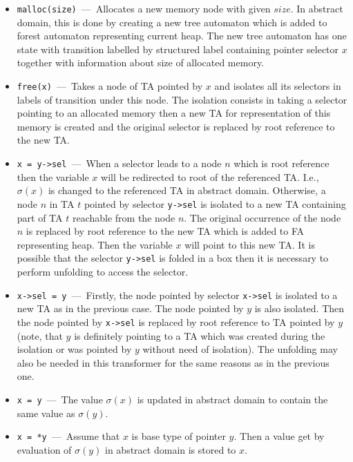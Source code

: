 \documentclass[a4paper, 12pt]{article}
\begin{document}
\begin{itemize}
	\item \texttt{malloc(size)} \,---\, Allocates a new memory node with given $size$.
		In abstract domain, this is done by creating a new tree automaton which
		is added to forest automaton representing current heap.
		The new tree automaton has one state with transition labelled by
		structured label containing pointer selector $x$ together with information
		about size of allocated memory.
	\item \texttt{free(x)} \,---\, Takes a node of TA pointed by $x$ and isolates all
		its selectors in labels of transition under this node.
		The isolation consists in taking a selector pointing to an allocated memory
		then a new TA for representation of this memory is created and
		the original selector is replaced by root reference to the new TA.
	\item \texttt{x = y->sel} \,---\, When a selector leads to a node $n$ which is root
		reference then the variable $x$ will be redirected to root of the referenced TA.
		I.e., $\sigma(x)$ is changed to the referenced TA in abstract domain.
		Otherwise, a node $n$ in TA $t$ pointed by selector \texttt{y->sel} is isolated to a new TA
		containing part of TA $t$ reachable from the node $n$.
		The original occurrence of the node $n$ is replaced by root reference
		to the new TA which is added to FA representing heap.
		Then the variable $x$ will point to this new TA.
		It is possible that the selector \texttt{y->sel} is folded
		in a box then it is necessary to perform unfolding
		to access the selector.
		
	\item \texttt{x->sel = y} \,---\, Firstly, the node pointed by selector \texttt{x->sel}
		is isolated to a new TA as in the previous case.
		The node pointed by $y$ is also isolated. 
		Then the node pointed by \texttt{x->sel} is replaced
		by root reference to TA pointed by $y$ (note, that
		$y$ is definitely pointing to a TA which was created
		during the isolation or was pointed by $y$ without need of isolation).
		The unfolding may also be needed in this transformer for
		the same reasons as in the previous one.
	
	\item \texttt{x = y} \,---\, The value $\sigma(x)$ is updated in abstract
		domain to contain the same value as $\sigma(y)$.

	\item \texttt{x = *y} \,---\, Assume that $x$ is base type of pointer $y$.
		Then a value get by evaluation of $\sigma(y)$ in abstract domain is
		stored to $x$.
	
\end{itemize}
\end{document}
